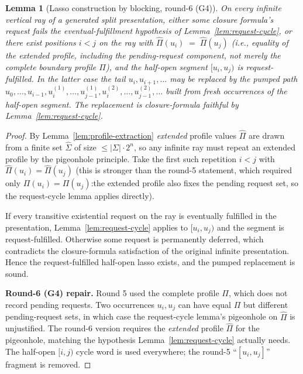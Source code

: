 \documentclass[11pt]{article}
\newtheorem{lemma}[theorem]{Lemma}
\newcommand{\extProf}{\widehat\Pi}
\newcommand{\extSigma}{\widehat\Sigma}
\begin{document}
\begin{lemma}[Lasso construction by blocking, round-6 (G4)]\label{lem:lasso}
On every infinite vertical ray of a generated split presentation,
either some closure formula's request fails the eventual-fulfillment
hypothesis of Lemma~\ref{lem:request-cycle}, or there exist
positions $i<j$ on the ray with
\(
  \extProf(u_i)\;=\;\extProf(u_j)
\)
(i.e., equality of the \emph{extended} profile, including the
pending-request component, not merely the complete boundary profile
$\Pi$), and the half-open segment $[u_i,u_j)$ is request-fulfilled.
In the latter case the tail $u_i,u_{i+1},\ldots$ may be replaced by
the pumped path
$u_0,\ldots,u_{i-1},u_i^{(1)},\ldots,u_{j-1}^{(1)},
u_i^{(2)},\ldots,u_{j-1}^{(2)},\ldots$ built from fresh
occurrences of the half-open segment.  The replacement is
closure-formula faithful by Lemma~\ref{lem:request-cycle}.
\end{lemma}

\begin{proof}
By Lemma~\ref{lem:profile-extraction} \emph{extended} profile values
$\extProf$ are drawn from a finite set $\extSigma$ of size
$\le|\Sigma|\cdot 2^n$, so any infinite ray must repeat an extended
profile by the pigeonhole principle.  Take the first such
repetition $i<j$ with $\extProf(u_i)=\extProf(u_j)$ (this is
stronger than the round-5 statement, which required only
$\Pi(u_i)=\Pi(u_j)$:\@ the extended profile also fixes the pending
request set, so the request-cycle lemma applies directly).

If every transitive existential request on the ray is eventually
fulfilled in the presentation, Lemma~\ref{lem:request-cycle}
applies to $[u_i,u_j)$ and the segment is request-fulfilled.
Otherwise some request is permanently deferred, which contradicts
the closure-formula satisfaction of the original infinite
presentation.  Hence the request-fulfilled half-open lasso exists,
and the pumped replacement is sound.

\textbf{Round-6 (G4) repair.}  Round 5 used the complete profile
$\Pi$, which does not record pending requests.  Two occurrences
$u_i,u_j$ can have equal $\Pi$ but different pending-request sets,
in which case the request-cycle lemma's pigeonhole on
$\widehat\Pi$ is unjustified.  The round-6 version requires the
\emph{extended} profile $\widehat\Pi$ for the pigeonhole, matching
the hypothesis Lemma~\ref{lem:request-cycle} actually needs.  The
half-open $[i,j)$ cycle word is used everywhere; the round-5
``$[u_i,u_j]$'' fragment is removed.
\end{proof}
\end{document}
